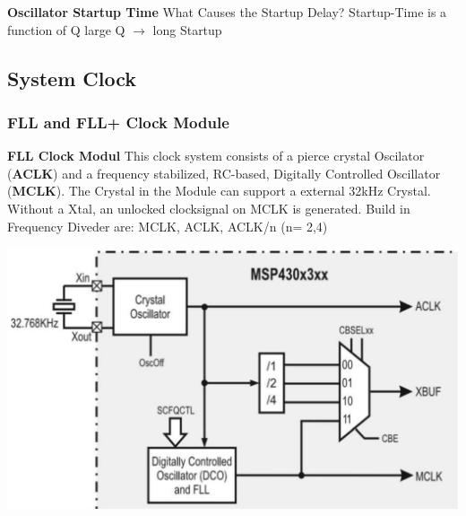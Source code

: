 \textbf{Oscillator Startup Time }\newline
What Causes the Startup Delay?\newline
Startup-Time is a function of Q \qquad large Q $ \rightarrow $ long Startup
\clearpage

\subsection{System Clock }
\subsubsection{FLL and FLL+ Clock Module }
\begin{minipage}{0.55\linewidth}
    \textbf{FLL Clock Modul}\newline
    This clock system consists of a pierce crystal Oscilator (\textbf{ACLK}) and a frequency stabilized, RC-based, Digitally Controlled Oscillator (\textbf{MCLK}).\newline
    The Crystal in the Module can support a external 32kHz Crystal.
    Without a Xtal, an unlocked clocksignal on MCLK is generated.\newline\newline
    Build in Frequency Diveder are:\newline
    MCLK, ACLK, ACLK/n (n= 2,4)
\end{minipage}
\begin{minipage}{0.45\linewidth}
    \includegraphics[width=0.8\linewidth]{images/FLLClock} 
\end{minipage}

